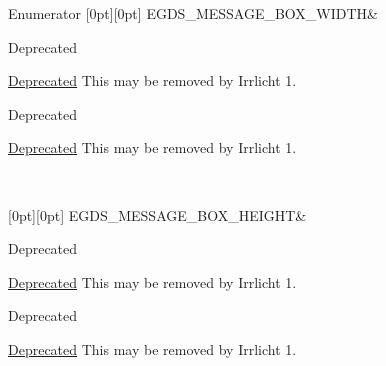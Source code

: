\begin{DoxyEnumFields}{Enumerator}
[0pt][0pt]{}\mbox{\label{namespaceirr_1_1gui_a27be6aa12d4985a5005983182fe99d56a0ade91b37c22ba07165cdc7147fbc766}} 
E\+G\+D\+S\+\_\+\+M\+E\+S\+S\+A\+G\+E\+\_\+\+B\+O\+X\+\_\+\+W\+I\+D\+TH&\begin{DoxyRefDesc}{Deprecated}
\item[\hyperlink{deprecated__deprecated000005}{Deprecated}]This may be removed by Irrlicht 1. \end{DoxyRefDesc}


\begin{DoxyRefDesc}{Deprecated}
\item[\hyperlink{deprecated__deprecated000031}{Deprecated}]This may be removed by Irrlicht 1. \end{DoxyRefDesc}
\\
\hline

[0pt][0pt]{}\mbox{\label{namespaceirr_1_1gui_a27be6aa12d4985a5005983182fe99d56aa8686458f7f4b2eb27de52fea2250e2c}} 
E\+G\+D\+S\+\_\+\+M\+E\+S\+S\+A\+G\+E\+\_\+\+B\+O\+X\+\_\+\+H\+E\+I\+G\+HT&\begin{DoxyRefDesc}{Deprecated}
\item[\hyperlink{deprecated__deprecated000006}{Deprecated}]This may be removed by Irrlicht 1. \end{DoxyRefDesc}


\begin{DoxyRefDesc}{Deprecated}
\item[\hyperlink{deprecated__deprecated000032}{Deprecated}]This may be removed by Irrlicht 1. \end{DoxyRefDesc}
\\
\hline


\end{DoxyEnumFields}
